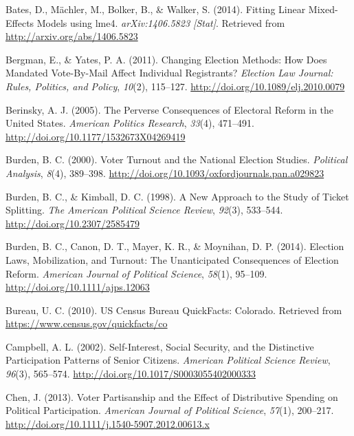 \documentclass[12pt,twoside]{reedthesis}
\begin{document}
  \hypertarget{ref-bates_fitting_2014}{}
  Bates, D., Mächler, M., Bolker, B., \& Walker, S. (2014). Fitting Linear
  Mixed-Effects Models using lme4. \emph{arXiv:1406.5823 {[}Stat{]}}.
  Retrieved from \url{http://arxiv.org/abs/1406.5823}
  
  \hypertarget{ref-bergman_changing_2011}{}
  Bergman, E., \& Yates, P. A. (2011). Changing Election Methods: How Does
  Mandated Vote-By-Mail Affect Individual Registrants? \emph{Election Law
  Journal: Rules, Politics, and Policy}, \emph{10}(2), 115--127.
  \url{http://doi.org/10.1089/elj.2010.0079}
  
  \hypertarget{ref-berinsky_perverse_2005}{}
  Berinsky, A. J. (2005). The Perverse Consequences of Electoral Reform in
  the United States. \emph{American Politics Research}, \emph{33}(4),
  471--491. \url{http://doi.org/10.1177/1532673X04269419}
  
  \hypertarget{ref-burden_voter_2000}{}
  Burden, B. C. (2000). Voter Turnout and the National Election Studies.
  \emph{Political Analysis}, \emph{8}(4), 389--398.
  \url{http://doi.org/10.1093/oxfordjournals.pan.a029823}
  
  \hypertarget{ref-burden_new_1998}{}
  Burden, B. C., \& Kimball, D. C. (1998). A New Approach to the Study of
  Ticket Splitting. \emph{The American Political Science Review},
  \emph{92}(3), 533--544. \url{http://doi.org/10.2307/2585479}
  
  \hypertarget{ref-burden_election_2014}{}
  Burden, B. C., Canon, D. T., Mayer, K. R., \& Moynihan, D. P. (2014).
  Election Laws, Mobilization, and Turnout: The Unanticipated Consequences
  of Election Reform. \emph{American Journal of Political Science},
  \emph{58}(1), 95--109. \url{http://doi.org/10.1111/ajps.12063}
  
  \hypertarget{ref-us_census_bureau_us_2010}{}
  Bureau, U. C. (2010). US Census Bureau QuickFacts: Colorado. Retrieved
  from \url{https://www.census.gov/quickfacts/co}
  
  \hypertarget{ref-campbell_self-interest_2002}{}
  Campbell, A. L. (2002). Self-Interest, Social Security, and the
  Distinctive Participation Patterns of Senior Citizens. \emph{American
  Political Science Review}, \emph{96}(3), 565--574.
  \url{http://doi.org/10.1017/S0003055402000333}
  
  \hypertarget{ref-chen_voter_2013}{}
  Chen, J. (2013). Voter Partisanship and the Effect of Distributive
  Spending on Political Participation. \emph{American Journal of Political
  Science}, \emph{57}(1), 200--217.
  \url{http://doi.org/10.1111/j.1540-5907.2012.00613.x}
  
\end{document}

